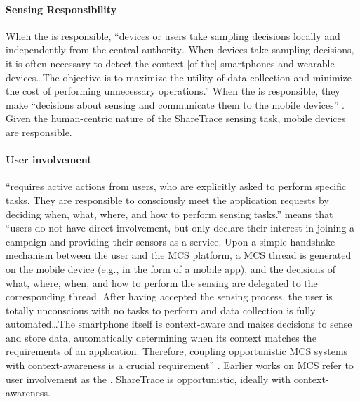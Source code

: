 \paragraph{Sensing Responsibility}

When the  is responsible, ``devices or users take sampling decisions locally and independently from the central authority{\ldots}When devices take sampling decisions, it is often necessary to detect the context [of the] smartphones and wearable devices{\ldots}The objective is to maximize the utility of data collection and minimize the cost of performing unnecessary operations.'' When the  is responsible, they make ``decisions about sensing and communicate them to the mobile devices'' \citep{Capponi2019}. Given the human-centric nature of the ShareTrace sensing task, mobile devices are responsible.

\paragraph{User involvement}

 ``requires active actions from users, who are explicitly asked to perform specific tasks. They are responsible to consciously meet the application requests by deciding when, what, where, and how to perform sensing tasks.''  means that ``users do not have direct involvement, but only declare their interest in joining a campaign and providing their sensors as a service. Upon a simple handshake mechanism between the user and the MCS platform, a MCS thread is generated on the mobile device (e.g., in the form of a mobile app), and the decisions of what, where, when, and how to perform the sensing are delegated to the corresponding thread. After having accepted the sensing process, the user is totally unconscious with no tasks to perform and data collection is fully automated{\ldots}The smartphone itself is context-aware and makes decisions to sense and store data, automatically determining when its context matches the requirements of an application. Therefore, coupling opportunistic MCS systems with context-awareness is a crucial requirement'' \citep{Capponi2019}. Earlier works on MCS refer to user involvement as the  \citep{Lane2010, Ganti2011, Ma2014}. ShareTrace is opportunistic, ideally with context-awareness.

